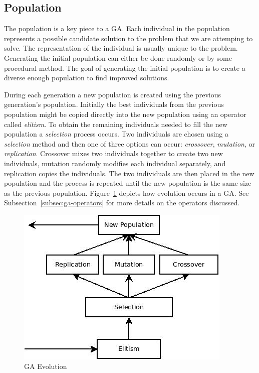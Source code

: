 \subsection{Population}

The population is a key piece to a GA. Each individual in the population represents a possible candidate solution to the problem that we are attemping to solve. The representation of the individual is usually unique to the problem. Generating the initial population can either be done randomly or by some procedural method. The goal of generating the initial population is to create a diverse enough population to find improved solutions.

During each generation a new population is created using the previous generation's population. Initially the best individuals from the previous population might be copied directly into the new population using an operator called \textit{elitism}. To obtain the remaining individuals needed to fill the new population a \textit{selection} process occurs. Two individuals are chosen using a \textit{selection} method and then one of three options can occur: \textit{crossover}, \textit{mutation}, or \textit{replication}. Crossover mixes two individuals together to create two new individuals, mutation randomly modifies each individual separately, and replication copies the individuals. The two individuals are then placed in the new population and the process is repeated until the new population is the same size as the previous population. Figure~\ref{fig:gaFlowchart} depicts how evolution occurs in a GA. See Subsection~\ref{subsec:ga-operators} for more details on the operators discussed.

\begin{figure}[H]
	\centering
	\includegraphics[bb=0 0 288 390,scale=0.5]{figures/GA.jpeg}
	\caption{GA Evolution}
	\label{fig:gaFlowchart}
\end{figure}

